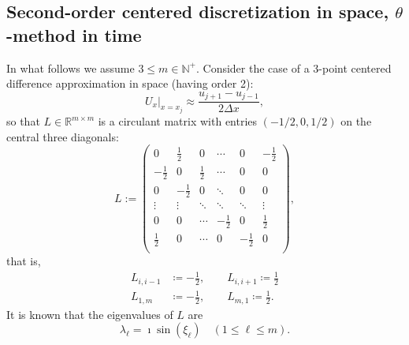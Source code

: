 \documentclass[a4paper]{article}
\newcommand{\dx}{\Delta x}
\newcommand{\nplus}{\mathbb{N}^+}
\begin{document}
\subsection{Second-order centered discretization in space, \texorpdfstring{$\theta$}{}-method in time}\label{sectioncentered}
In what follows we assume $3\le m\in\nplus$. Consider the case of a 3-point centered difference approximation in space (having order 2):
\[
    U_x\Big|_{x=x_j} \approx \frac{u_{j+1}-u_{j-1}}{2\dx},
\]
so that $L\in\mathbb{R}^{m\times m}$ is a circulant matrix with entries $(-1/2, 0, 1/2)$ on the central
three diagonals:
\begin{equation}\label{Ldef}
L:=\left(
\begin{array}{cccccc}
 0 & \frac{1}{2} & 0  & \cdots & 0 & -\frac{1}{2} \\
 -\frac{1}{2} & 0 & \frac{1}{2} &  \cdots & 0 & 0 \\
 0 & -\frac{1}{2} & 0 &  \ddots & 0 & 0\\
 \vdots  & \vdots  & \ddots  & \ddots & \ddots & \vdots \\
  0 & 0 & \cdots  & -\frac{1}{2} & 0 & \frac{1}{2} \\
 \frac{1}{2} & 0 & \cdots & 0 & -\frac{1}{2} & 0 \\
\end{array}
\right),
\end{equation}
that is,
\begin{subequations}
\begin{align}
    L_{i,i-1} & \coloneqq -\frac{1}{2},\quad\quad L_{i,i+1} \coloneqq  \frac{1}{2} \\
    L_{1,m} & \coloneqq -\frac{1}{2}, \quad \quad L_{m,1} \coloneqq \frac{1}{2}.
\end{align}
\end{subequations}
It is known that the eigenvalues of $L$ are 
\begin{equation}\label{Leigenvalues}
\lambda_\ell=\imath \sin(\xi_\ell)\quad (1\le\ell\le m).
\end{equation}
\end{document}
